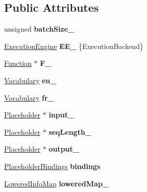 \subsection*{Public Attributes}
\begin{DoxyCompactItemize}
\item 
\mbox{\label{struct_model_ae3a41c5a645cca84d08b9e7095be0cd7}} 
unsigned {\bfseries batch\+Size\+\_\+}
\item 
\mbox{\label{struct_model_a967e57e686e4b18c21b1c765d5ec1789}} 
\hyperlink{classglow_1_1_execution_engine}{Execution\+Engine} {\bfseries E\+E\+\_\+} \{Execution\+Backend\}
\item 
\mbox{\label{struct_model_a8b949de2c69d2052208df54e2bde4056}} 
\hyperlink{classglow_1_1_function}{Function} $\ast$ {\bfseries F\+\_\+}
\item 
\mbox{\label{struct_model_a39d9aa560b265f456a6d6e4bf23ae550}} 
\hyperlink{struct_vocabulary}{Vocabulary} {\bfseries en\+\_\+}
\item 
\mbox{\label{struct_model_a824a3bcfc5f5d0b9fff662ff5ac058c4}} 
\hyperlink{struct_vocabulary}{Vocabulary} {\bfseries fr\+\_\+}
\item 
\mbox{\label{struct_model_ab498b3dbb24268f924657d0a6b4121d9}} 
\hyperlink{classglow_1_1_placeholder}{Placeholder} $\ast$ {\bfseries input\+\_\+}
\item 
\mbox{\label{struct_model_a7169760e56cabd02395db59f2cd849f4}} 
\hyperlink{classglow_1_1_placeholder}{Placeholder} $\ast$ {\bfseries seq\+Length\+\_\+}
\item 
\mbox{\label{struct_model_abf382997bf9ead8bc695d7f6dfa90849}} 
\hyperlink{classglow_1_1_placeholder}{Placeholder} $\ast$ {\bfseries output\+\_\+}
\item 
\mbox{\label{struct_model_a838eb21e6b3c6228cb680a83174e1314}} 
\hyperlink{classglow_1_1_placeholder_bindings}{Placeholder\+Bindings} {\bfseries bindings}
\item 
\mbox{\label{struct_model_ab910501ce8e7039ab58cf4aaf6c232bb}} 
\hyperlink{namespaceglow_a419aca63ca48becda137d774dd06493c}{Lowered\+Info\+Map} {\bfseries lowered\+Map\+\_\+}
\end{DoxyCompactItemize}


